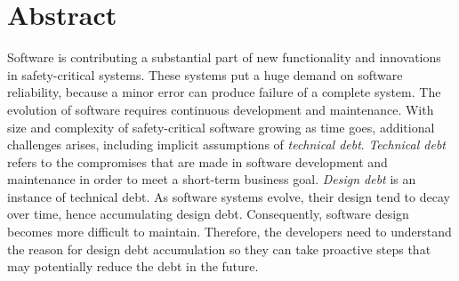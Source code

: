 


\clearpage
{} 				
\setcounter{page}{1}

\pagestyle{fancy}
\fancyhf{}
\renewcommand{\chaptermark}[1]{\markboth{\chaptername\ \thechapter.\ #1}{}}
\renewcommand{\sectionmark}[1]{\markright{\thesection\ #1}}
\renewcommand{\headrulewidth}{0.1ex}
\renewcommand{\footrulewidth}{0.1ex}
\fancyfoot[LE,RO]{\thepage}
\fancypagestyle{plain}{\fancyhf{}\fancyfoot[LE,RO]{\thepage}\renewcommand{\headrulewidth}{0ex}}

\section*{\Huge Abstract}
Software is contributing a substantial part of new functionality and innovations in safety-critical systems. These systems put a huge demand on software reliability, because a minor error can produce failure of a complete system. The evolution of software requires continuous development and maintenance. With size and complexity of safety-critical software growing as time goes, additional challenges arises, including implicit assumptions of \textit{technical debt}. \textit{Technical debt} refers to the compromises that are made in software development and maintenance in order to meet a short-term business goal. \textit{Design debt} is an instance of technical debt. As software systems evolve, their design tend to decay over time, hence accumulating design debt. Consequently, software design becomes more difficult to maintain. Therefore, the developers need to understand the reason for design debt accumulation so they can take proactive steps that may potentially reduce the debt in the future.

